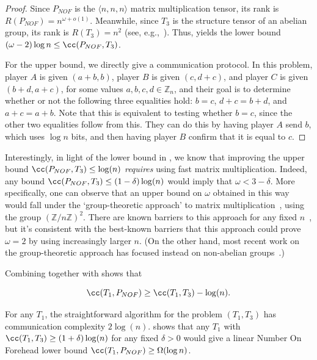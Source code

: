\begin{proof}
    Since $P_{NOF}$ is the $\langle n,n,n \rangle$ matrix multiplication tensor, its rank is $R(P_{NOF}) = n^{\omega + o(1)}$. Meanwhile, since $T_3$ is the structure tensor of an abelian group, its rank is $R(T_3) = n^2$ (see, e.g.,~\cite[{Theorem 2.3 and Theorem 4.1}]{CU03}). Thus,  yields the lower bound $(\omega - 2) \log n \leq \cc(P_{NOF}, T_3)$.
    
    For the upper bound, we directly give a communication protocol. In this problem, player $A$ is given $(a+b,b)$, player $B$ is given $(c,d+c)$, and player $C$ is given $(b+d,a+c)$, for some values $a,b,c,d \in \mathbb{Z}_n$, and their goal is to determine whether or not the following three equalities hold: $b=c$, $d+c=b+d$, and $a+c=a+b$. Note that this is equivalent to testing whether $b=c$, since the other two equalities follow from this. They can do this by having player $A$ send $b$, which uses $\log n$ bits, and then having player $B$ confirm that it is equal to $c$.
\end{proof}

Interestingly, in light of the lower bound in , we know that improving the upper bound $\cc(P_{NOF}, T_3) \leq \log(n)$ \emph{requires} using fast matrix multiplication. Indeed, any bound $\cc(P_{NOF}, T_3) \leq (1 - \delta) \log(n)$ would imply that $\omega < 3 - \delta$. More specifically, one can observe that an upper bound on $\omega$ obtained in this way would fall under the `group-theoretic approach' to matrix multiplication~\cite{CU03}, using the group $(\mathbb{Z} / n\mathbb{Z})^2$. There are known barriers to this approach for any fixed $n$~\cite{BCHGNSU17}, but it's consistent with the best-known barriers that this approach could prove $\omega = 2$ by using increasingly larger $n$. (On the other hand, most recent work on the group-theoretic approach has focused instead on non-abelian groups~\cite{BCGPU22}.)


Combining  together with  shows that
\begin{fact}\label{fact:noftogroup}
    $$\cc(T_1, P_{NOF}) \geq \cc(T_1, T_3) - \log(n).$$
\end{fact}
For any $T_1$, the straightforward algorithm for the problem $(T_1, T_3)$ has communication complexity $2 \log (n)$.  shows that any $T_1$ with $\cc(T_1, T_3) \geq (1 + \delta) \log (n)$ for any fixed $\delta>0$ would give a linear Number On Forehead lower bound $\cc(T_1, P_{NOF}) \geq \Omega( \log n)$.

